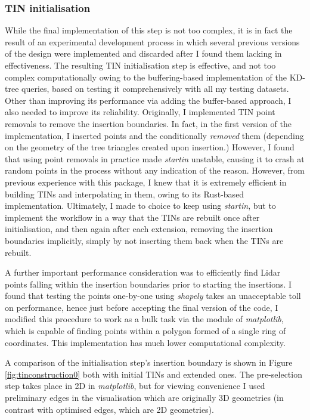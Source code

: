 \subsubsection{TIN initialisation}

While the final implementation of this step is not too complex, it is in fact the result of an experimental development process in which several previous versions of the design were implemented and discarded after I found them lacking in effectiveness. The resulting TIN initialisation step is effective, and not too complex computationally owing to the buffering-based implementation of the KD-tree queries, based on testing it comprehensively with all my testing datasets. Other than improving its performance via adding the buffer-based approach, I also needed to improve its reliability. Originally, I implemented TIN point removals to remove the insertion boundaries. In fact, in the first version of the implementation, I inserted points and the conditionally \textit{removed} them (depending on the geometry of the tree triangles created upon insertion.) However, I found that using point removals in practice made \textit{startin} unstable, causing it to crash at random points in the process without any indication of the reason. However, from previous experience with this package, I knew that it is extremely efficient in building TINs and interpolating in them, owing to its Rust-based implementation. Ultimately, I made to choice to keep using \textit{startin}, but to implement the workflow in a way that the TINs are rebuilt once after initialisation, and then again after each extension, removing the insertion boundaries implicitly, simply by not inserting them back when the TINs are rebuilt.

A further important performance consideration was to efficiently find Lidar points falling within the insertion boundaries prior to starting the insertions. I found that testing the points one-by-one using \textit{shapely} takes an unacceptable toll on performance, hence just before accepting the final version of the code, I modified this procedure to work as a bulk task via the  module of \textit{matplotlib}, which is capable of finding points within a polygon formed of a single ring of coordinates. This implementation has much lower computational complexity.

A comparison of the initialisation step's insertion boundary is shown in Figure \ref{fig:tinconstruction0} both with initial TINs and extended ones. The pre-selection step takes place in 2D in \textit{matplotlib}, but for viewing convenience I used preliminary edges in the visualisation which are originally 3D geometries (in contrast with optimised edges, which are 2D geometries).

